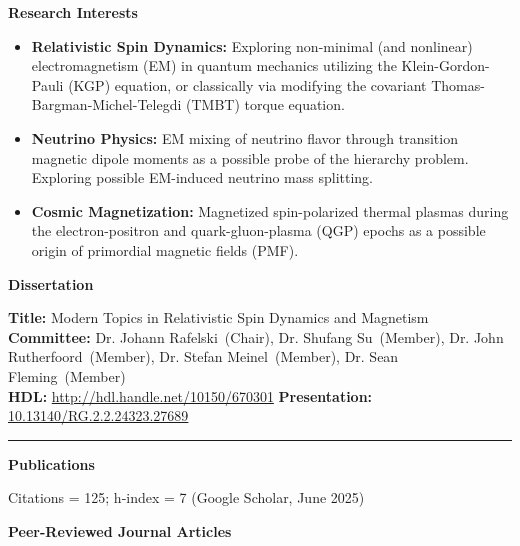 \documentclass[11pt]{article}
\begin{document}
\medskip

{\Large\textbf{Research Interests}}

\begin{itemize}[leftmargin=*,nosep]
    \item \textbf{Relativistic Spin Dynamics:} Exploring non-minimal (and nonlinear) electromagnetism (EM) in quantum mechanics utilizing the Klein-Gordon-Pauli (KGP) equation, or classically via modifying the covariant Thomas-Bargman-Michel-Telegdi (TMBT) torque equation.
    \item \textbf{Neutrino Physics:} EM mixing of neutrino flavor through transition magnetic dipole moments as a possible probe of the hierarchy problem. Exploring possible EM-induced neutrino mass splitting.
    \item \textbf{Cosmic Magnetization:} Magnetized spin-polarized thermal plasmas during the electron-positron and quark-gluon-plasma (QGP) epochs as a possible origin of primordial magnetic fields (PMF).
\end{itemize}

\medskip

{\Large\textbf{Dissertation}}

\textbf{Title:} Modern Topics in Relativistic Spin Dynamics and Magnetism\\[0.3em]
\textbf{Committee:} Dr. Johann Rafelski~(Chair), Dr. Shufang Su~(Member), Dr. John Rutherfoord~(Member), Dr. Stefan Meinel~(Member), Dr. Sean Fleming~(Member)\\[0.3em]
\textbf{HDL:} \href{http://hdl.handle.net/10150/670301}{http://hdl.handle.net/10150/670301} \textbf{Presentation:} \href{http://dx.doi.org/10.13140/RG.2.2.24323.27689}{10.13140/RG.2.2.24323.27689}

\noindent\rule{\linewidth}{1.0pt}

{\Large\textbf{Publications}}

Citations = 125; h-index = 7 (Google Scholar, June 2025)

{\large\textbf{Peer-Reviewed Journal Articles}}
\end{document}

